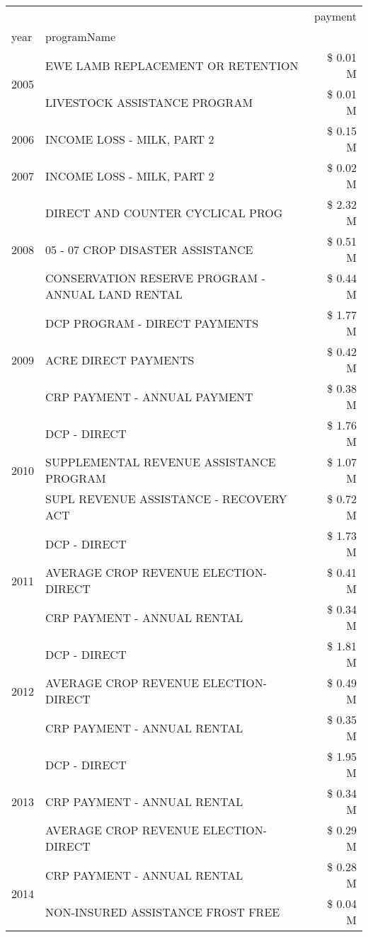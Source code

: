 \begin{tabular}{llr}
\toprule
 &  & payment \\
year & programName &  \\
\midrule
\multirow[t]{2}{*}{2005} & EWE LAMB REPLACEMENT OR RETENTION & \$ 0.01 M \\
 & LIVESTOCK ASSISTANCE PROGRAM & \$ 0.01 M \\
\cline{1-3}
2006 & INCOME LOSS - MILK, PART 2 & \$ 0.15 M \\
\cline{1-3}
2007 & INCOME LOSS - MILK, PART 2 & \$ 0.02 M \\
\cline{1-3}
\multirow[t]{3}{*}{2008} & DIRECT AND COUNTER CYCLICAL PROG & \$ 2.32 M \\
 & 05 - 07 CROP DISASTER ASSISTANCE & \$ 0.51 M \\
 & CONSERVATION RESERVE PROGRAM - ANNUAL LAND RENTAL & \$ 0.44 M \\
\cline{1-3}
\multirow[t]{3}{*}{2009} & DCP PROGRAM - DIRECT PAYMENTS & \$ 1.77 M \\
 & ACRE DIRECT PAYMENTS & \$ 0.42 M \\
 & CRP PAYMENT - ANNUAL PAYMENT & \$ 0.38 M \\
\cline{1-3}
\multirow[t]{3}{*}{2010} & DCP - DIRECT & \$ 1.76 M \\
 & SUPPLEMENTAL REVENUE ASSISTANCE PROGRAM & \$ 1.07 M \\
 & SUPL REVENUE ASSISTANCE - RECOVERY ACT & \$ 0.72 M \\
\cline{1-3}
\multirow[t]{3}{*}{2011} & DCP - DIRECT & \$ 1.73 M \\
 & AVERAGE CROP REVENUE ELECTION-DIRECT & \$ 0.41 M \\
 & CRP PAYMENT - ANNUAL RENTAL & \$ 0.34 M \\
\cline{1-3}
\multirow[t]{3}{*}{2012} & DCP - DIRECT & \$ 1.81 M \\
 & AVERAGE CROP REVENUE ELECTION-DIRECT & \$ 0.49 M \\
 & CRP PAYMENT - ANNUAL RENTAL & \$ 0.35 M \\
\cline{1-3}
\multirow[t]{3}{*}{2013} & DCP - DIRECT & \$ 1.95 M \\
 & CRP PAYMENT - ANNUAL RENTAL & \$ 0.34 M \\
 & AVERAGE CROP REVENUE ELECTION-DIRECT & \$ 0.29 M \\
\cline{1-3}
\multirow[t]{3}{*}{2014} & CRP PAYMENT - ANNUAL RENTAL & \$ 0.28 M \\
 & NON-INSURED ASSISTANCE FROST FREE & \$ 0.04 M \\

\end{tabular}
